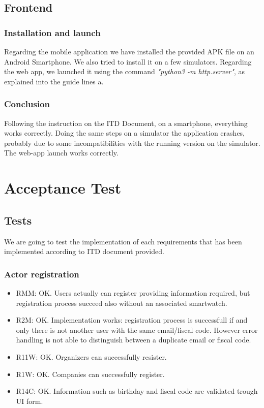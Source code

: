 \documentclass{article}
\begin{document}
\newpage	
\subsection{Frontend}
\subsubsection{Installation and launch}
Regarding the mobile application we have installed the provided APK file on an Android Smartphone. We also tried to install it on a few simulators.\newline
Regarding the web app, we launched it using the command \textit{"python3 -m http.server"}, as explained into the guide lines a.
\subsubsection{Conclusion}
Following the instruction on the ITD Document, on a smartphone, everything works correctly.
Doing the same steps on a simulator the application crashes, probably due to some incompatibilities with the running version on the simulator.	\newline
The web-app launch works correctly.
\newpage



\section{Acceptance Test}
\subsection{Tests}
We are going to test the implementation of each requirements that has been implemented according to ITD document provided.

\subsubsection{Actor registration}
\begin{itemize}
	\item RMM: OK. Users actually can register providing information required, but registration process succeed also without an associated smartwatch.
	\item R2M: OK. Implementation works: registration process is successfull if and only there is not another user with the same email/fiscal code. However error handling is not able to distinguish between a duplicate email or fiscal code.
	\item R11W: OK. Organizers can successfully resister.
	\item R1W: OK. Companies can successfully register.
	\item R14C: OK. Information such as birthday and fiscal code are validated trough UI form.
\end{itemize}
\end{document}
